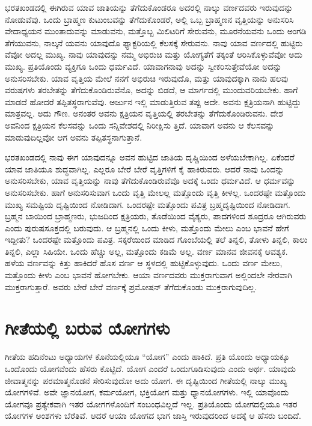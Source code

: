 ಭರತಖಂಡದಲ್ಲಿ ಈಗಿರುವ ಯಾವ ಜಾತಿಯನ್ನು ತೆಗೆದುಕೊಂಡರೂ ಅದರಲ್ಲಿ ನಾಲ್ಕು ವರ್ಣದವರು ಇರುವುದನ್ನು ನೋಡುವೆವು. ಒಂದು ಬ್ರಾಹ್ಮಣ ಕುಟುಂಬವನ್ನು ತೆಗೆದುಕೊಂಡರೆ, ಅಲ್ಲಿ ಒಬ್ಬ ಬ್ರಾಹ್ಮಣನ ವೃತ್ತಿಯನ್ನು ಅನುಸರಿಸಿ ವೇದಾಧ್ಯಯನ ಮುಂತಾದುವನ್ನು ಮಾಡುವನು, ಮತ್ತೊಬ್ಬ ಮಿಲಿಟರಿಗೆ ಸೇರುವನು, ಮೂರನೆಯವನು ಒಂದು ಅಂಗಡಿ ತೆಗೆಯುವನು, ನಾಲ್ಕನೆ ಯವನು ಯಾವುದೊ ಫ್ಯಾಕ್ಟರಿಯಲ್ಲಿ ಕೆಲಸಕ್ಕೆ ಸೇರುವನು. ನಾವು ಯಾವ ವರ್ಣದಲ್ಲಿ ಹುಟ್ಟಿರು ವೆವೋ ಅದಲ್ಲ ಮುಖ್ಯ. ನಾವು ಯಾವುದನ್ನು ನಮ್ಮ ಅಭಿರುಚಿ ಮತ್ತು ಯೋಗ್ಯತೆಗೆ ತಕ್ಕಂತೆ ಆರಿಸಿಕೊಳ್ಳುವೆವೋ ಅದು ಮುಖ್ಯ. ಪ್ರತಿಯೊಂದು ವ್ಯಕ್ತಿಗೂ ಒಂದು ಧರ್ಮವಿದೆ. ಯಾವಾಗ\break ನಾವು ಅದನ್ನು ಸ್ವೀಕರಿಸುತ್ತೇವೆಯೋ ಅದನ್ನು ಅನುಸರಿಸಬೇಕು. ಯಾವ ವೃತ್ತಿಯ ಮೇಲೆ ನನಗೆ ಅಭಿರುಚಿ ಇರುವುದೊ, ಮತ್ತು ಯಾವುದಕ್ಕಾಗಿ ನಾನು ಹಲವು ವರುಷಗಳು ತರಬೇತನ್ನು ತೆಗೆದುಕೊಂಡಿರುವೆನೊ, ಅದನ್ನು ಬಿಡದೆ, ಆ ಮಾರ್ಗದಲ್ಲಿ ಮುಂದುವರಿಯಬೇಕು. ಹಾಗೆ ಮಾಡದೆ ಹೋದರೆ ತಪ್ಪಿತಸ್ಥರಾಗುವೆವು. ಅರ್ಜುನ ಇಲ್ಲಿ ಮಾಡುತ್ತಿರುವ ತಪ್ಪು ಅದೇ. ಅವನು ಕ್ಷತ್ರಿಯನಾಗಿ ಹುಟ್ಟಿದ್ದು ಮಾತ್ರವಲ್ಲ. ಅದು ಗೌಣ. ಅನಂತರ ಅವನು ಕ್ಷತ್ರಿಯನ ವೃತ್ತಿಯಲ್ಲಿ ತರಬೇತನ್ನು ತೆಗೆದುಕೊಂಡಿರುವನು. ದೇಶ ಅವನಿಂದ ಕ್ಷತ್ರಿಯನ ಕೆಲಸವನ್ನು ಒಂದು ಸನ್ನಿವೇಶದಲ್ಲಿ ನಿರೀಕ್ಷಿಸು ತ್ತಿದೆ. ಯಾವಾಗ ಅವನು ಆ ಕೆಲಸವನ್ನು ಮಾಡುವುದಿಲ್ಲವೋ ಆಗ ಅವನು ತಪ್ಪಿತಸ್ಥನಾಗುತ್ತಾನೆ.

ಭರತಖಂಡದಲ್ಲಿ ನಾವು ಈಗ ಯಾವುದನ್ನೂ ಅವನ ಹುಟ್ಟಿದ ಜಾತಿಯ ದೃಷ್ಚಿಯಿಂದ ಅಳೆಯಬೇಕಾಗಿಲ್ಲ. ಏಕೆಂದರೆ ಯಾವ ಜಾತಿಯೂ ಶುದ್ಧವಾಗಿಲ್ಲ. ಎಲ್ಲರೂ ಬೇರೆ ಬೇರೆ ವೃತ್ತಿಗಳಿಗೆ ಕೈ ಹಾಕಿರುವರು. ಆದರೆ ನಾವು ಒಂದನ್ನು ಅನುಸರಿಸಬೇಕು, ಯಾವ ವೃತ್ತಿಯನ್ನು ನಾವು ತೆಗೆದುಕೊಂಡಿರುವೆವೊ ಅದಕ್ಕೆ ಒಂದು ಧರ್ಮವಿದೆ. ಆ ಧರ್ಮವನ್ನು ಅನುಸರಿಸಬೇಕು. ಹಾಗೆ ಅನುಸರಿಸುವಾಗ ಒಂದು ವೃತ್ತಿ ಮೇಲಲ್ಲ ಮತ್ತೊಂದು ವೃತ್ತಿ ಕೀಳಲ್ಲ. ಒಂದರಷ್ಟೇ ಮತ್ತೊಂದು ಮುಖ್ಯ ಸಮಷ್ಟಿಯ ದೃಷ್ಟಿಯಿಂದ ನೋಡಿದಾಗ. ಒಂದರಷ್ಟೇ ಮತ್ತೊಂದು ಪವಿತ್ರ ಬ್ರಹ್ಮದೃಷ್ಟಿಯಿಂದ ನೋಡಿದಾಗ. ಬ್ರಹ್ಮನ ಬಾಯಿಂದ ಬ್ರಾಹ್ಮಣರು, ಭುಜದಿಂದ ಕ್ಷತ್ರಿಯರು, ತೊಡೆಯಿಂದ ವೈಶ್ಯರು, ಪಾದಗಳಿಂದ ಶೂದ್ರರೂ ಆಗಿರುವರು ಎಂದು ಪುರುಷಸೂಕ್ತದಲ್ಲಿ ಬರುವುದು. ಆ ಬ್ರಹ್ಮನಲ್ಲಿ ಒಂದು ಕೀಳು, ಮತ್ತೊಂದು ಮೇಲು ಎಂಬ ಭಾವನೆ ಹೇಗೆ ಇದ್ದೀತು? ಒಂದರಷ್ಟೇ ಮತ್ತೊಂದು ಪವಿತ್ರ. ಸಕ್ಕರೆಯಿಂದ ಮಾಡಿದ ಗೊಂಬೆಯಲ್ಲಿ ತಲೆ ತಿನ್ನಲಿ, ತೋಳು ತಿನ್ನಲಿ, ಕಾಲು ತಿನ್ನಲಿ, ಎಲ್ಲಾ ಸಿಹಿಯೇ. ಒಂದು ಹೆಚ್ಚು ಅಲ್ಲ, ಮತ್ತೊಂದು ಕಡಿಮೆ ಅಲ್ಲ. ವರ್ಣ ಮಾನವ ಜೀವನಕ್ಕೆ ಆವಶ್ಯಕ. ಹಳೆಯ ವರ್ಣವನ್ನು ಕಿತ್ತು ಹಾಕಿದರೆ ಹೊಸ ವರ್ಣ ಆ ಸ್ಥಳದಲ್ಲಿ ಹುಟ್ಟಿಕೊಳ್ಳುವುದು. ಒಂದು ವರ್ಣ ಮೇಲು, ಮತ್ತೊಂದು ಕೀಳು ಎಂಬ ಭಾವನೆ ಹೋಗಬೇಕು. ಆಯಾ ವರ್ಣದವರು ಮುಕ್ತರಾಗುವಾಗ ಅಲ್ಲಿಂದಲೇ ನೇರವಾಗಿ ಮುಕ್ತರಾಗುತ್ತಾರೆ. ಅವರು ಬೇರೆ ಬೇರೆ ವರ್ಣಕ್ಕೆ ಪ್ರಮೋಷನ್ ತೆಗೆದುಕೊಂಡು ಮುಕ್ತರಾಗುವುದಿಲ್ಲ.


\section*{ಗೀತೆಯಲ್ಲಿ ಬರುವ ಯೋಗಗಳು}

ಗೀತೆಯ ಹದಿನೆಂಟು ಅಧ್ಯಾಯಗಳ ಕೊನೆಯಲ್ಲಿಯೂ “ಯೋಗ” ಎಂದು ಹಾಕಿದೆ. ಪ್ರತಿ ಯೊಂದು ಅಧ್ಯಾಯಕ್ಕೂ ಒಂದೊಂದು ಯೋಗವೆಂದು ಹೆಸರು ಕೊಟ್ಟಿದೆ. ಯೋಗ ಎಂದರೆ ಒಂದುಗೂಡಿಸುವುದು ಎಂದು ಅರ್ಥ. ಯಾವುದು ಜೀವಾತ್ಮನನ್ನು ಪರಮಾತ್ಮನೊಡನೆ ಸೇರಿಸು\-ವುದೋ ಅದು ಯೋಗ. ಈ ದೃಷ್ಟಿಯಿಂದ ಗೀತೆಯಲ್ಲಿ ನಾಲ್ಕು ಮುಖ್ಯ ಯೋಗಗಳಿವೆ. ಅವೇ ಜ್ಞಾನಯೋಗ, ಕರ್ಮಯೋಗ, ಭಕ್ತಿಯೋಗ ಮತ್ತು ಧ್ಯಾನಯೋಗಗಳು. ಇಲ್ಲಿ ಯಾವೊಂದು ಯೋಗವೂ ಪ್ರತ್ಯೇಕವಾಗಿ ಇತರ ಯೋಗಗಳೊಂದಿಗೆ ಸಂಬಂಧವಿಲ್ಲದೆ ಇಲ್ಲ. ಪ್ರತಿಯೊಂದು ಯೋಗದಲ್ಲಿಯೂ ಇತರ ಯೋಗಗಳ ಅಂಶಗಳು ಬೆರೆತಿವೆ. ಆದರೆ ಆಯಾ ಯೋಗದ ಭಾಗ ಜಾಸ್ತಿ ಇರುವುದರಿಂದ ಅದಕ್ಕೆ ಆ ಹೆಸರು ಬಂದಿದೆ.

